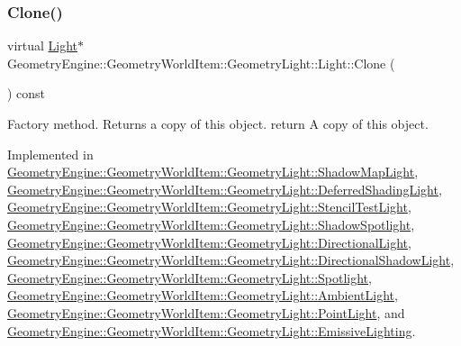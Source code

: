 \subsubsection{\texorpdfstring{Clone()}{Clone()}}
{\footnotesize\ttfamily virtual \mbox{\hyperlink{class_geometry_engine_1_1_geometry_world_item_1_1_geometry_light_1_1_light}{Light}}$\ast$ Geometry\+Engine\+::\+Geometry\+World\+Item\+::\+Geometry\+Light\+::\+Light\+::\+Clone (\begin{DoxyParamCaption}{ }\end{DoxyParamCaption}) const\hspace{0.3cm}{\ttfamily [pure virtual]}}

Factory method. Returns a copy of this object. return A copy of this object. 

Implemented in \mbox{\hyperlink{class_geometry_engine_1_1_geometry_world_item_1_1_geometry_light_1_1_shadow_map_light_a48eb6af2e6bb8487568ee4265fbc49ee}{Geometry\+Engine\+::\+Geometry\+World\+Item\+::\+Geometry\+Light\+::\+Shadow\+Map\+Light}}, \mbox{\hyperlink{class_geometry_engine_1_1_geometry_world_item_1_1_geometry_light_1_1_deferred_shading_light_a7ef4d7b7a41cbda01a55bcb0475484d3}{Geometry\+Engine\+::\+Geometry\+World\+Item\+::\+Geometry\+Light\+::\+Deferred\+Shading\+Light}}, \mbox{\hyperlink{class_geometry_engine_1_1_geometry_world_item_1_1_geometry_light_1_1_stencil_test_light_a6434a228dc64537ff9984c82eaf8ab07}{Geometry\+Engine\+::\+Geometry\+World\+Item\+::\+Geometry\+Light\+::\+Stencil\+Test\+Light}}, \mbox{\hyperlink{class_geometry_engine_1_1_geometry_world_item_1_1_geometry_light_1_1_shadow_spotlight_a0ea8fd05d26f6e780d352168c28f940d}{Geometry\+Engine\+::\+Geometry\+World\+Item\+::\+Geometry\+Light\+::\+Shadow\+Spotlight}}, \mbox{\hyperlink{class_geometry_engine_1_1_geometry_world_item_1_1_geometry_light_1_1_directional_light_a032fe23fba3bd8d0fd35f9d4ac6a9de0}{Geometry\+Engine\+::\+Geometry\+World\+Item\+::\+Geometry\+Light\+::\+Directional\+Light}}, \mbox{\hyperlink{class_geometry_engine_1_1_geometry_world_item_1_1_geometry_light_1_1_directional_shadow_light_ae5016cad41a62c4c870a942acc3f9afe}{Geometry\+Engine\+::\+Geometry\+World\+Item\+::\+Geometry\+Light\+::\+Directional\+Shadow\+Light}}, \mbox{\hyperlink{class_geometry_engine_1_1_geometry_world_item_1_1_geometry_light_1_1_spotlight_a7feb062f72b8110cf7d8d614d2daad92}{Geometry\+Engine\+::\+Geometry\+World\+Item\+::\+Geometry\+Light\+::\+Spotlight}}, \mbox{\hyperlink{class_geometry_engine_1_1_geometry_world_item_1_1_geometry_light_1_1_ambient_light_a890a2ff8ce5cde88cdc51b4e598ca9af}{Geometry\+Engine\+::\+Geometry\+World\+Item\+::\+Geometry\+Light\+::\+Ambient\+Light}}, \mbox{\hyperlink{class_geometry_engine_1_1_geometry_world_item_1_1_geometry_light_1_1_point_light_a68321b758cff76fa55f3cd5ef2824035}{Geometry\+Engine\+::\+Geometry\+World\+Item\+::\+Geometry\+Light\+::\+Point\+Light}}, and \mbox{\hyperlink{class_geometry_engine_1_1_geometry_world_item_1_1_geometry_light_1_1_emissive_lighting_ac7e3e90cadf700764fccdacc94238bac}{Geometry\+Engine\+::\+Geometry\+World\+Item\+::\+Geometry\+Light\+::\+Emissive\+Lighting}}.

